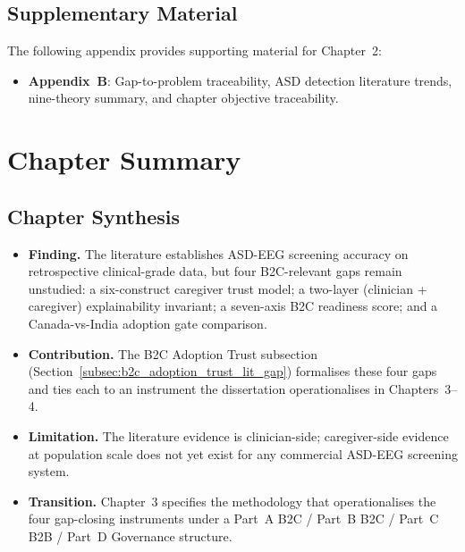 \subsection{Supplementary Material}

The following appendix provides supporting material for Chapter~2:
\begin{itemize}[leftmargin=*, itemsep=2pt]
\item \textbf{Appendix~B}: Gap-to-problem traceability, ASD detection literature trends, nine-theory summary, and chapter objective traceability.
\end{itemize}

\section{Chapter Summary}

\subsection{Chapter Synthesis}
\label{subsec:ch2_synthesis}

\begin{itemize}[leftmargin=*, itemsep=2pt]
    \item \textbf{Finding.} The literature establishes ASD-EEG screening accuracy on retrospective clinical-grade data, but four B2C-relevant gaps remain unstudied: a six-construct caregiver trust model; a two-layer (clinician + caregiver) explainability invariant; a seven-axis B2C readiness score; and a Canada-vs-India adoption gate comparison.
    \item \textbf{Contribution.} The B2C Adoption Trust subsection (Section~\ref{subsec:b2c_adoption_trust_lit_gap}) formalises these four gaps and ties each to an instrument the dissertation operationalises in Chapters~3--4.
    \item \textbf{Limitation.} The literature evidence is clinician-side; caregiver-side evidence at population scale does not yet exist for any commercial ASD-EEG screening system.
    \item \textbf{Transition.} Chapter~3 specifies the methodology that operationalises the four gap-closing instruments under a Part~A B2C / Part~B B2C / Part~C B2B / Part~D Governance structure.
\end{itemize}



